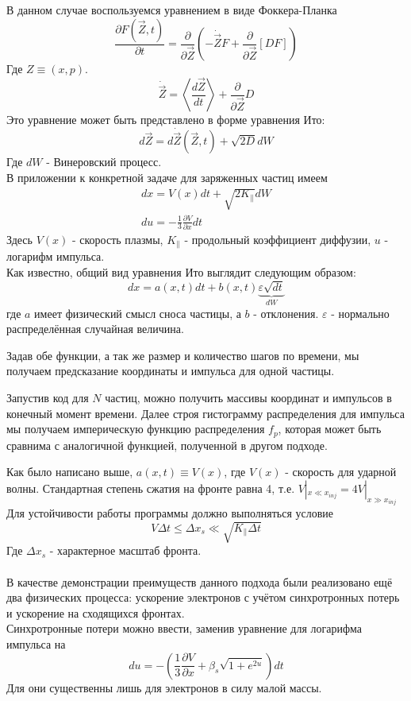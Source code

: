 \documentclass[a4paper,14pt]{extarticle} %
\begin{document}
В данном случае воспользуемся уравнением в виде Фоккера-Планка
\begin{equation}
\frac{\partial F(\vec{Z}, t)}{\partial t} = \frac{\partial}{\partial \vec{Z}}\left( -\dot{\vec{Z}}F+\frac{\partial}{\partial\vec{Z}}[DF]  \right)
\end{equation}
Где $Z\equiv (x, p)$.
\begin{equation}
\dot{\vec{Z}} = \left< \frac{d\vec{Z}}{dt} \right> + \frac{\partial}{\partial\vec{Z}} D
\end{equation}
Это уравнение может быть представлено в форме уравнения Ито:
\begin{equation}
d\vec{Z} = d\dot{\vec{Z}}(\vec{Z}, t)+\sqrt{2D}dW
\end{equation}
Где $dW$ - Винеровский процесс.\\
В приложении к конкретной задаче для заряженных частиц имеем
\begin{eqnarray}
dx = V(x)dt+\sqrt{2K_{\parallel}}dW\\
du = - \frac{1}{3} \frac{\partial V}{\partial x} dt
\end{eqnarray}
Здесь $V(x)$ - скорость плазмы, $K_\parallel$ - продольный коэффициент диффузии, $u$ - логарифм импульса.\\
Как известно, общий вид уравнения Ито выглядит следующим образом:
\begin{equation}
dx = a(x, t)dt + b(x,t) \underbrace{\varepsilon \sqrt{dt}}_{dW}
\end{equation}
где $a$ имеет физический смысл сноса частицы, а $b$ - отклонения. $\varepsilon$ - нормально распределённая случайная величина.

Задав обе функции, а так же размер и количество шагов по времени, мы получаем предсказание координаты и импульса для одной частицы.

Запустив код для $N$ частиц, можно получить массивы координат и импульсов в конечный момент времени. Далее строя гистограмму распределения для импульса мы получаем империческую функцию распределения $f_p$, которая может быть сравнима с аналогичной функцией, полученной в другом подходе.

Как было написано выше, $a(x,t) \equiv V(x)$, где $V(x)$ - скорость для ударной волны. Стандартная степень сжатия на фронте равна 4, т.е. $V|_{x \ll x_{inj}} = 4V|_{x \gg x_{inj}}$
Для устойчивости работы программы должно выполняться условие
\begin{equation}
V\Delta t \le \Delta x_s \ll \sqrt{K_\parallel \Delta t}
\end{equation}
Где $\Delta x_s$ - характерное масштаб фронта. ~\\~\\
В качестве демонстрации преимуществ данного подхода были реализовано ещё два физических процесса: ускорение электронов с учётом синхротронных потерь и ускорение на сходящихся фронтах.\\
Синхротронные потери можно ввести, заменив уравнение для логарифма импульса на 
\begin{equation}
du = - \left( \frac{1}{3} \frac{\partial V}{\partial x}  + \beta_s\sqrt{1+e^{2u}} \right) dt
\end{equation}
Для они существенны лишь для электронов в силу малой массы.
\end{document}
